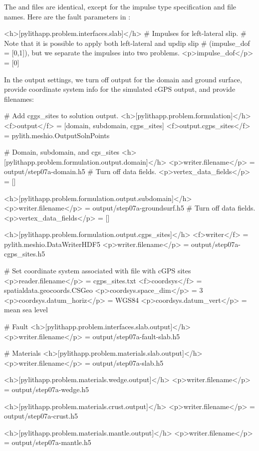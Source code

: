 The  and  files are
identical, except for the impulse type specification and file
names. Here are the fault parameters in :
\begin{cfg}
<h>[pylithapp.problem.interfaces.slab]</h>
# Impulses for left-lateral slip.
# Note that it is possible to apply both left-lateral and updip slip
# (impulse_dof = [0,1]), but we separate the impulses into two problems.
<p>impulse_dof</p> = [0]
\end{cfg}

In the output settings, we turn off output for the domain and ground
surface, provide coordinate system info for the simulated cGPS output,
and provide filenames:
\begin{cfg}
# Add cggs_sites to solution output.
<h>[pylithapp.problem.formulation]</h>
<f>output</f> = [domain, subdomain, cgps_sites]
<f>output.cgps_sites</f> = pylith.meshio.OutputSolnPoints

# Domain, subdomain, and cgs_sites
<h>[pylithapp.problem.formulation.output.domain]</h>
<p>writer.filename</p> = output/step07a-domain.h5
# Turn off data fields.
<p>vertex_data_fields</p> = []

<h>[pylithapp.problem.formulation.output.subdomain]</h>
<p>writer.filename</p> = output/step07a-groundsurf.h5
# Turn off data fields.
<p>vertex_data_fields</p> = []

<h>[pylithapp.problem.formulation.output.cgps_sites]</h>
<f>writer</f> = pylith.meshio.DataWriterHDF5
<p>writer.filename</p> = output/step07a-cgps_sites.h5

# Set coordinate system associated with file with cGPS sites
<p>reader.filename</p> = cgps_sites.txt
<f>coordsys</f> = spatialdata.geocoords.CSGeo
<p>coordsys.space_dim</p> = 3
<p>coordsys.datum_horiz</p> = WGS84
<p>coordsys.datum_vert</p> = mean sea level

# Fault
<h>[pylithapp.problem.interfaces.slab.output]</h>
<p>writer.filename</p> = output/step07a-fault-slab.h5

# Materials
<h>[pylithapp.problem.materials.slab.output]</h>
<p>writer.filename</p> = output/step07a-slab.h5

<h>[pylithapp.problem.materials.wedge.output]</h>
<p>writer.filename</p> = output/step07a-wedge.h5

<h>[pylithapp.problem.materials.crust.output]</h>
<p>writer.filename</p> = output/step07a-crust.h5

<h>[pylithapp.problem.materials.mantle.output]</h>
<p>writer.filename</p> = output/step07a-mantle.h5
\end{cfg}

